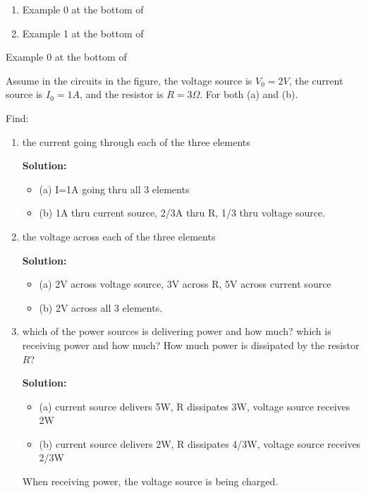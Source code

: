 \begin{enumerate}



\item Example 0 at the bottom of 

\item Example 1 at the bottom of 

\end{enumerate}



\item Example 0 at the bottom of 

\item Assume in the circuits in the figure, the voltage source is $V_0=2V$,
	the current source is $I_0=1A$, and the resistor is $R=3\Omega$.
	For both (a) and (b).


Find:
\begin{enumerate}
\item the current going through each of the three elements

{\bf Solution:}
\begin{itemize}
\item (a) I=1A going thru all 3 elements 
\item (b) 1A thru current source, 2/3A thru R, 1/3 thru voltage source.
\end{itemize}

\item the voltage across each of the three elements

{\bf Solution:}
\begin{itemize}
\item (a) 2V across voltage source, 3V across R, 5V across current source
\item (b) 2V across all 3 elements.
\end{itemize}

\item which of the power sources is delivering power and how much? which is 
	receiving power and how much? How much power is dissipated by the
	resistor $R$?

{\bf Solution:}
\begin{itemize}
\item (a) current source delivers 5W, R dissipates 3W, voltage source 
	receives 2W
\item (b) current source delivers 2W, R dissipates 4/3W, voltage source 
	receives 2/3W 
\end{itemize}
When receiving power, the voltage source is being charged.
\end{enumerate}

